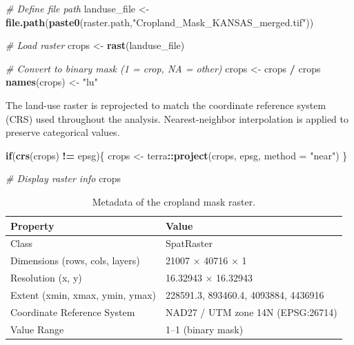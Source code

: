 \documentclass[
  10pt,
  b5paper,
  oneside]{book}
\newenvironment{Shaded}{\begin{snugshade}}{\end{snugshade}}
\newcommand{\AttributeTok}[1]{\textcolor[rgb]{0.13,0.29,0.53}{#1}}
\newcommand{\CommentTok}[1]{\textcolor[rgb]{0.56,0.35,0.01}{\textit{#1}}}
\newcommand{\ControlFlowTok}[1]{\textcolor[rgb]{0.13,0.29,0.53}{\textbf{#1}}}
\newcommand{\FunctionTok}[1]{\textcolor[rgb]{0.13,0.29,0.53}{\textbf{#1}}}
\newcommand{\NormalTok}[1]{#1}
\newcommand{\OtherTok}[1]{\textcolor[rgb]{0.56,0.35,0.01}{#1}}
\newcommand{\SpecialCharTok}[1]{\textcolor[rgb]{0.81,0.36,0.00}{\textbf{#1}}}
\newcommand{\StringTok}[1]{\textcolor[rgb]{0.31,0.60,0.02}{#1}}
\begin{document}
\begin{Shaded}
\begin{Highlighting}[]
\CommentTok{\# Define file path}
\NormalTok{landuse\_file }\OtherTok{\textless{}{-}} \FunctionTok{file.path}\NormalTok{(}\FunctionTok{paste0}\NormalTok{(raster.path,}\StringTok{"Cropland\_Mask\_KANSAS\_merged.tif"}\NormalTok{))}

\CommentTok{\# Load raster}
\NormalTok{crops }\OtherTok{\textless{}{-}} \FunctionTok{rast}\NormalTok{(landuse\_file)}

\CommentTok{\# Convert to binary mask (1 = crop, NA = other)}
\NormalTok{crops }\OtherTok{\textless{}{-}}\NormalTok{ crops }\SpecialCharTok{/}\NormalTok{ crops}
\FunctionTok{names}\NormalTok{(crops) }\OtherTok{\textless{}{-}} \StringTok{"lu"}
\end{Highlighting}
\end{Shaded}

The land-use raster is reprojected to match the coordinate reference system (CRS) used throughout the analysis. Nearest-neighbor interpolation is applied to preserve categorical values.

\begin{Shaded}
\begin{Highlighting}[]
\ControlFlowTok{if}\NormalTok{(}\FunctionTok{crs}\NormalTok{(crops) }\SpecialCharTok{!=}\NormalTok{ epsg)\{}
\NormalTok{  crops }\OtherTok{\textless{}{-}}\NormalTok{ terra}\SpecialCharTok{::}\FunctionTok{project}\NormalTok{(crops, epsg, }\AttributeTok{method =} \StringTok{"near"}\NormalTok{)}
\NormalTok{\}}

\CommentTok{\# Display raster info}
\NormalTok{crops}
\end{Highlighting}
\end{Shaded}

\begin{table}

\caption{\label{tab:table-crop-raster-info}Metadata of the cropland mask raster.}
\centering
\begin{tabular}[t]{l|l}
\hline
Property & Value\\
\hline
Class & SpatRaster\\
\hline
Dimensions (rows, cols, layers) & 21007 × 40716 × 1\\
\hline
Resolution (x, y) & 16.32943 × 16.32943\\
\hline
Extent (xmin, xmax, ymin, ymax) & 228591.3, 893460.4, 4093884, 4436916\\
\hline
Coordinate Reference System & NAD27 / UTM zone 14N (EPSG:26714)\\
\hline
Value Range & 1–1 (binary mask)\\
\hline
\end{tabular}
\end{table}
\end{document}
